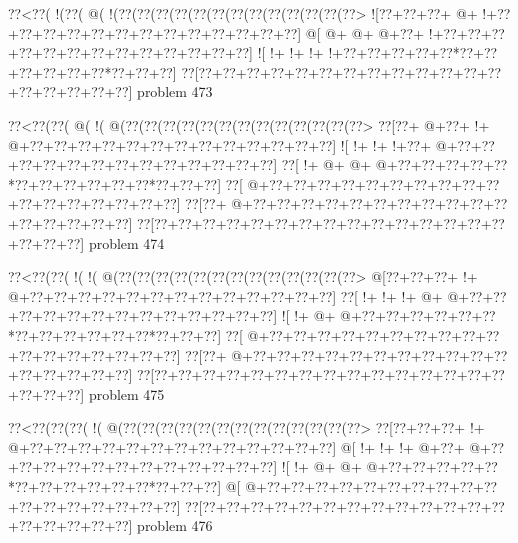 \vbox{\vbox{\goo
\0??<\0??(\- !(\0??(\- @(\- !(\0??(\0??(\0??(\0??(\0??(\0??(\0??(\0??(\0??(\0??(\0??(\0??(\0??>
\- ![\0??+\0??+\0??+\- @+\- !+\0??+\0??+\0??+\0??+\0??+\0??+\0??+\0??+\0??+\0??+\0??+\0??+\0??]
\- @[\- @+\- @+\- @+\0??+\- !+\0??+\0??+\0??+\0??+\0??+\0??+\0??+\0??+\0??+\0??+\0??+\0??+\0??]
\- ![\- !+\- !+\- !+\- !+\0??+\0??+\0??+\0??+\0??*\0??+\0??+\0??+\0??+\0??+\0??*\0??+\0??+\0??]
\0??[\0??+\0??+\0??+\0??+\0??+\0??+\0??+\0??+\0??+\0??+\0??+\0??+\0??+\0??+\0??+\0??+\0??+\0??]
}
\hfil problem 473\hfil\break
}



\vbox{\vbox{\goo
\0??<\0??(\0??(\- @(\- !(\- @(\0??(\0??(\0??(\0??(\0??(\0??(\0??(\0??(\0??(\0??(\0??(\0??(\0??>
\0??[\0??+\- @+\0??+\- !+\- @+\0??+\0??+\0??+\0??+\0??+\0??+\0??+\0??+\0??+\0??+\0??+\0??+\0??]
\- ![\- !+\- !+\- !+\0??+\- @+\0??+\0??+\0??+\0??+\0??+\0??+\0??+\0??+\0??+\0??+\0??+\0??+\0??]
\0??[\- !+\- @+\- @+\- @+\0??+\0??+\0??+\0??+\0??*\0??+\0??+\0??+\0??+\0??+\0??*\0??+\0??+\0??]
\0??[\- @+\0??+\0??+\0??+\0??+\0??+\0??+\0??+\0??+\0??+\0??+\0??+\0??+\0??+\0??+\0??+\0??+\0??]
\0??[\0??+\- @+\0??+\0??+\0??+\0??+\0??+\0??+\0??+\0??+\0??+\0??+\0??+\0??+\0??+\0??+\0??+\0??]
\0??[\0??+\0??+\0??+\0??+\0??+\0??+\0??+\0??+\0??+\0??+\0??+\0??+\0??+\0??+\0??+\0??+\0??+\0??]
}
\hfil problem 474\hfil\break
}



\vbox{\vbox{\goo
\0??<\0??(\0??(\- !(\- !(\- @(\0??(\0??(\0??(\0??(\0??(\0??(\0??(\0??(\0??(\0??(\0??(\0??(\0??>
\- @[\0??+\0??+\0??+\- !+\- @+\0??+\0??+\0??+\0??+\0??+\0??+\0??+\0??+\0??+\0??+\0??+\0??+\0??]
\0??[\- !+\- !+\- !+\- @+\- @+\0??+\0??+\0??+\0??+\0??+\0??+\0??+\0??+\0??+\0??+\0??+\0??+\0??]
\- ![\- !+\- @+\- @+\0??+\0??+\0??+\0??+\0??+\0??*\0??+\0??+\0??+\0??+\0??+\0??*\0??+\0??+\0??]
\0??[\- @+\0??+\0??+\0??+\0??+\0??+\0??+\0??+\0??+\0??+\0??+\0??+\0??+\0??+\0??+\0??+\0??+\0??]
\0??[\0??+\- @+\0??+\0??+\0??+\0??+\0??+\0??+\0??+\0??+\0??+\0??+\0??+\0??+\0??+\0??+\0??+\0??]
\0??[\0??+\0??+\0??+\0??+\0??+\0??+\0??+\0??+\0??+\0??+\0??+\0??+\0??+\0??+\0??+\0??+\0??+\0??]
}
\hfil problem 475\hfil\break
}



\vbox{\vbox{\goo
\0??<\0??(\0??(\0??(\- !(\- @(\0??(\0??(\0??(\0??(\0??(\0??(\0??(\0??(\0??(\0??(\0??(\0??(\0??>
\0??[\0??+\0??+\0??+\- !+\- @+\0??+\0??+\0??+\0??+\0??+\0??+\0??+\0??+\0??+\0??+\0??+\0??+\0??]
\- @[\- !+\- !+\- !+\- @+\0??+\- @+\0??+\0??+\0??+\0??+\0??+\0??+\0??+\0??+\0??+\0??+\0??+\0??]
\- ![\- !+\- @+\- @+\- @+\0??+\0??+\0??+\0??+\0??*\0??+\0??+\0??+\0??+\0??+\0??*\0??+\0??+\0??]
\- @[\- @+\0??+\0??+\0??+\0??+\0??+\0??+\0??+\0??+\0??+\0??+\0??+\0??+\0??+\0??+\0??+\0??+\0??]
\0??[\0??+\0??+\0??+\0??+\0??+\0??+\0??+\0??+\0??+\0??+\0??+\0??+\0??+\0??+\0??+\0??+\0??+\0??]
}
\hfil problem 476\hfil\break
}




